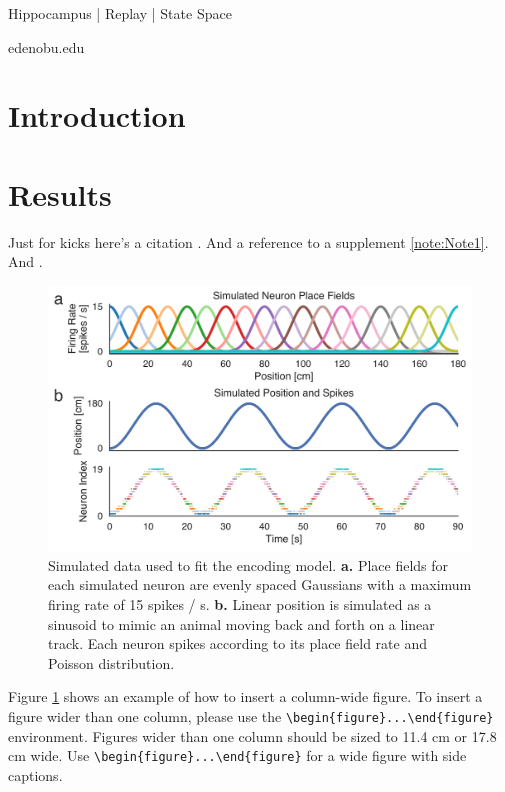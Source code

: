 \documentclass[times, twoside, watermark]{zHenriquesLab-StyleBioRxiv}
\begin{document}
\begin{keywords}
Hippocampus | Replay | State Space
\end{keywords}

\begin{corrauthor}
edeno\at bu.edu
\end{corrauthor}

\section*{Introduction}
\Blindtext

\section*{Results}

Just for kicks here's a citation \cite{Gustafsson2016}. And a reference to a supplement \cref{note:Note1}. And .
\Blindtext

\begin{figure}%
\centering
\includegraphics[width=1.0\linewidth]{figures/Figure2.pdf}
\caption{Simulated data used to fit the encoding model. \textbf{a.} Place fields for each simulated neuron are evenly spaced Gaussians with a maximum firing rate of 15 spikes / s. \textbf{b.} Linear position is simulated as a sinusoid to mimic an animal moving back and forth on a linear track. Each neuron spikes according to its place field rate and Poisson distribution.}
\label{fig:computerNo}
\end{figure}

\Blindtext

Figure \ref{fig:computerNo} shows an example of how to insert a column-wide figure. To insert a figure wider than one column, please use the \verb|\begin{figure}...\end{figure}| environment. Figures wider than one column should be sized to 11.4 cm or 17.8 cm wide. Use \verb|\begin{figure}...\end{figure}| for a wide figure with side captions.
\end{document}
